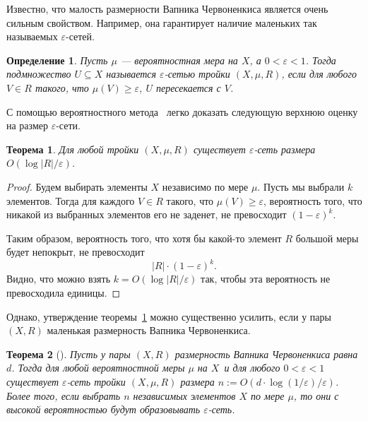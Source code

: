 \documentclass[12pt]{article}
\newcommand{\eps}{\varepsilon}
\DeclareRobustCommand*{\CC}{\,\textendash\,\hskip 0pt}
\newtheorem{definition}{Определение}
\newtheorem{theorem}{Теорема}
\begin{document}
    Известно, что малость размерности Вапника\CC Червоненкиса является очень сильным свойством. Например, она гарантирует
    наличие маленьких так называемых $\varepsilon$-сетей.

    \begin{definition}
        Пусть $\mu$ --- вероятностная мера на $X$, а $0 < \varepsilon < 1$.
        Тогда подмножество $U \subseteq X$
        называется \emph{$\varepsilon$-сетью} тройки $(X, \mu, R)$, если для любого
        $V \in R$ такого, что $\mu(V) \geq \varepsilon$, $U$ пересекается с $V$.
    \end{definition}

    С помощью вероятностного метода~\cite{AS92} легко доказать следующую верхнюю оценку на размер
    $\varepsilon$-сети.

    \begin{theorem}
        \label{naive_epsilon_net}
        Для любой тройки $(X, \mu, R)$ существует $\varepsilon$-сеть размера
        $O(\log |R| / \varepsilon)$.
    \end{theorem}
    \begin{proof}
        Будем выбирать элементы $X$ независимо по мере $\mu$.
        Пусть мы выбрали $k$ элементов. Тогда для каждого $V \in R$ такого, что
        $\mu(V) \geq \varepsilon$, вероятность того, что никакой из выбранных элементов
        его не заденет, не превосходит $(1 - \varepsilon)^k$.

        Таким образом, вероятность того, что хотя бы какой-то элемент $R$ большой меры будет
        непокрыт, не превосходит
        $$
            |R| \cdot (1 - \varepsilon)^k.
        $$
        Видно, что можно взять $k = O(\log |R| / \varepsilon)$ так, чтобы эта вероятность не превосходила
        единицы.
    \end{proof}

    Однако, утверждение теоремы~\ref{naive_epsilon_net} можно существенно усилить, если у пары $(X, R)$
    маленькая размерность Вапника\CC Червоненкиса.

    \begin{theorem}[\cite{HW86}]
        \label{full_epsilon_net}
        Пусть у пары $(X, R)$ размерность Вапника\CC Червоненкиса равна $d$. Тогда для любой вероятностной меры $\mu$ на $X$\
        и для любого $0 < \varepsilon < 1$ существует $\varepsilon$-сеть тройки $(X, \mu, R)$ размера
        $n := O(d \cdot \log(1 / \varepsilon) / \varepsilon)$.
        Более того, если выбрать $n$ независимых элементов $X$ по мере $\mu$, то они с высокой вероятностью будут
        образовывать $\eps$-сеть.
    \end{theorem}
\end{document}
